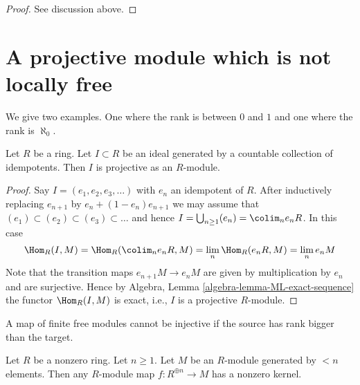 \begin{proof}
See discussion above.
\end{proof}



\section{A projective module which is not locally free}
\label{section-projective-not-locally-free}

\noindent
We give two examples. One where the rank is between $0$ and $1$
and one where the rank is $\aleph_0$.

\begin{lemma}
\label{lemma-ideal-generated-by-idempotents-projective}
Let $R$ be a ring. Let $I \subset R$ be an ideal generated by
a countable collection of idempotents. Then $I$ is projective
as an $R$-module.
\end{lemma}

\begin{proof}
Say $I = (e_1, e_2, e_3, \ldots)$ with $e_n$ an idempotent of $R$.
After inductively replacing $e_{n + 1}$ by $e_n + (1 - e_n)e_{n + 1}$
we may assume that $(e_1) \subset (e_2) \subset (e_3) \subset \ldots$
and hence $I = \bigcup_{n \geq 1} (e_n) = \colim_n e_nR$.
In this case
$$
\Hom_R(I, M) = \Hom_R(\colim_n e_nR, M)
= \lim_n \Hom_R(e_nR, M) = \lim_n e_nM
$$
Note that the transition maps $e_{n + 1}M \to e_nM$ are given
by multiplication by $e_n$ and are surjective. Hence by
Algebra, Lemma \ref{algebra-lemma-ML-exact-sequence}
the functor $\Hom_R(I, M)$ is exact, i.e., $I$ is a projective
$R$-module.
\end{proof}

\begin{lemma}
\label{lemma-map-cannot-be-injective}
\begin{slogan}
A map of finite free modules cannot be injective if the source has
rank bigger than the target.
\end{slogan}
Let $R$ be a nonzero ring. Let $n \geq 1$. Let $M$ be an $R$-module generated
by $< n$ elements. Then any $R$-module map $f : R^{\oplus n} \to M$ has a
nonzero kernel.
\end{lemma}

